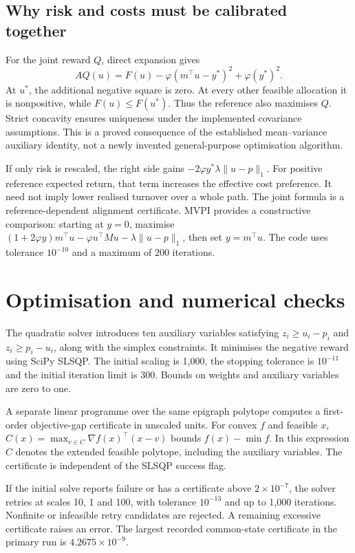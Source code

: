 \documentclass[11pt,a4paper]{article}
\begin{document}
\subsection{Why risk and costs must be calibrated together}
For the joint reward $Q$, direct expansion gives
\[
A Q(u)=F(u)-\varphi(m^\top u-y^*)^2+\varphi(y^*)^2.
\]
At $u^*$, the additional negative square is zero. At every other feasible allocation it is nonpositive, while $F(u)\le F(u^*)$. Thus the reference also maximises $Q$. Strict concavity ensures uniqueness under the implemented covariance assumptions. This is a proved consequence of the established mean--variance auxiliary identity, not a newly invented general-purpose optimisation algorithm.

If only risk is rescaled, the right side gains $-2\varphi y^*\lambda\|u-p\|_1$. For positive reference expected return, that term increases the effective cost preference. It need not imply lower realised turnover over a whole path. The joint formula is a reference-dependent alignment certificate. MVPI provides a constructive comparison: starting at $y=0$, maximise $(1+2\varphi y)m^\top u-\varphi u^\top Mu-\lambda\|u-p\|_1$, then set $y=m^\top u$. The code uses tolerance $10^{-10}$ and a maximum of 200 iterations.

\section{Optimisation and numerical checks}
The quadratic solver introduces ten auxiliary variables satisfying $z_i\ge u_i-p_i$ and $z_i\ge p_i-u_i$, along with the simplex constraints. It minimises the negative reward using SciPy SLSQP. The initial scaling is 1,000, the stopping tolerance is $10^{-11}$ and the initial iteration limit is 300. Bounds on weights and auxiliary variables are zero to one.

A separate linear programme over the same epigraph polytope computes a first-order objective-gap certificate in unscaled units. For convex $f$ and feasible $x$, $C(x)=\max_{v\in C}\nabla f(x)^\top(x-v)$ bounds $f(x)-\min f$. In this expression $C$ denotes the extended feasible polytope, including the auxiliary variables. The certificate is independent of the SLSQP success flag.

If the initial solve reports failure or has a certificate above $2\times10^{-7}$, the solver retries at scales 10, 1 and 100, with tolerance $10^{-13}$ and up to 1,000 iterations. Nonfinite or infeasible retry candidates are rejected. A remaining excessive certificate raises an error. The largest recorded common-state certificate in the primary run is $4.2675\times10^{-9}$.
\end{document}
